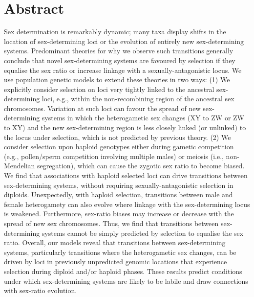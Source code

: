 \documentclass[10pt,letterpaper]{article}
\begin{document}
\section*{Abstract}
Sex determination is remarkably dynamic; many taxa display shifts in the location of sex-determining loci or the evolution of entirely new sex-determining systems. 
Predominant theories for why we observe such transitions generally conclude that novel sex-determining systems are favoured by selection if they equalise the sex ratio or increase linkage with a sexually-antagonistic locus. 
We use population genetic models to extend these theories in two ways: 
(1) We explicitly consider selection on loci very tightly linked to the ancestral sex-determining loci, e.g., within the non-recombining region of the ancestral sex chromosomes. 
Variation at such loci can favour the spread of new sex-determining systems in which the heterogametic sex changes (XY to ZW or ZW to XY) and the new sex-determining region is less closely linked (or unlinked) to the locus under selection, which is not predicted by previous theory. 
(2) We consider selection upon haploid genotypes either during gametic competition (e.g., pollen/sperm competition involving multiple males) or meiosis (i.e., non-Mendelian segregation), which can cause the zygotic sex ratio to become biased. 
We find that associations with haploid selected loci can drive transitions between sex-determining systems, without requiring sexually-antagonistic selection in diploids. 
Unexpectedly, with haploid selection, transitions between male and female heterogamety can also evolve where linkage with the sex-determining locus is weakened. 
Furthermore, sex-ratio biases may increase or decrease with the spread of new sex chromosomes. 
Thus, we find that transitions between sex-determining systems cannot be simply predicted by selection to equalise the sex ratio. 
Overall, our models reveal that transitions between sex-determining systems, particularly transitions where the heterogametic sex changes, can be driven by loci in previously unpredicted genomic locations that experience selection during diploid and/or haploid phases.
These results predict conditions under which sex-determining systems are likely to be labile and draw connections with sex-ratio evolution.


\end{document}
